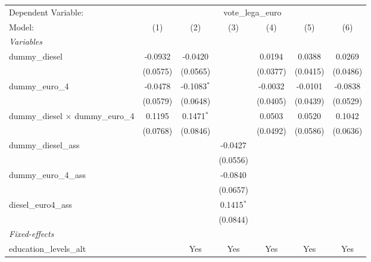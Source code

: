 
\begingroup
\centering
\begin{tabular}{lcccccc}
   \tabularnewline \midrule \midrule
   Dependent Variable: & \multicolumn{6}{c}{vote\_lega\_euro}\\
   Model:                                    & (1)      & (2)           & (3)          & (4)      & (5)      & (6)\\  
   \midrule
   \emph{Variables}\\
   dummy\_diesel                             & -0.0932  & -0.0420       &              & 0.0194   & 0.0388   & 0.0269\\   
                                             & (0.0575) & (0.0565)      &              & (0.0377) & (0.0415) & (0.0486)\\   
   dummy\_euro\_4                            & -0.0478  & -0.1083$^{*}$ &              & -0.0032  & -0.0101  & -0.0838\\   
                                             & (0.0579) & (0.0648)      &              & (0.0405) & (0.0439) & (0.0529)\\   
   dummy\_diesel $\times$ dummy\_euro\_4     & 0.1195   & 0.1471$^{*}$  &              & 0.0503   & 0.0520   & 0.1042\\   
                                             & (0.0768) & (0.0846)      &              & (0.0492) & (0.0586) & (0.0636)\\   
   dummy\_diesel\_ass                        &          &               & -0.0427      &          &          &   \\   
                                             &          &               & (0.0556)     &          &          &   \\   
   dummy\_euro\_4\_ass                       &          &               & -0.0840      &          &          &   \\   
                                             &          &               & (0.0657)     &          &          &   \\   
   diesel\_euro4\_ass                        &          &               & 0.1415$^{*}$ &          &          &   \\   
                                             &          &               & (0.0844)     &          &          &   \\   
   \midrule
   \emph{Fixed-effects}\\
   education\_levels\_alt                    &          & Yes           & Yes          & Yes      & Yes      & Yes\\  

\end{tabular}
